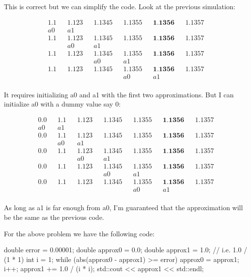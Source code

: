 This is correct but we can simplify the code. Look at the previous
simulation:

\begin{align*}
1.1         &&1.123       &&1.1345      &&1.1355      &&\textbf{1.1356} &&1.1357 \\
a0         &&a1 \\
1.1         &&1.123       &&1.1345      &&1.1355      &&\textbf{1.1356} &&1.1357 \\
&&a0        &&a1 \\
1.1         &&1.123       &&1.1345      &&1.1355      &&\textbf{1.1356} &&1.1357 \\
&&&&a0       &&a1 \\
1.1         &&1.123       &&1.1345      &&1.1355      &&\textbf{1.1356} &&1.1357 \\
&&&&&&a0      &&a1 \\
\end{align*}

It requires initializing a0 and a1 with the first two approximations.
But I can initialize a0 with a dummy value say 0:

\begin{align*}
0.0         &&1.1       &&1.123      &&1.1345      &&1.1355     &&\textbf{1.1356} &&1.1357 \\
a0         &&a1 \\
0.0         &&1.1       &&1.123      &&1.1345      &&1.1355     &&\textbf{1.1356} &&1.1357 \\
&&a0        &&a1 \\
0.0         &&1.1       &&1.123      &&1.1345      &&1.1355     &&\textbf{1.1356} &&1.1357 \\
&&&&a0       &&a1 \\
0.0         &&1.1       &&1.123      &&1.1345      &&1.1355     &&\textbf{1.1356} &&1.1357 \\
&&&&&&a0      &&a1 \\
0.0         &&1.1       &&1.123      &&1.1345      &&1.1355     &&\textbf{1.1356} &&1.1357 \\
&&&&&&&&a0      &&a1 \\
\end{align*}


As long as a1 is far enough from a0, I'm guaranteed that
the approximation will be the same as the previous code.

For the above problem we have the following code:
\begin{console}
double error = 0.00001;
double approx0 = 0.0;
double approx1 = 1.0; // i.e. 1.0 / (1 * 1)
int i = 1;
while (abs(approx0 - approx1) >= error)
{     
      approx0 = approx1;
      i++;
      approx1 += 1.0 / (i * i);
      std::cout << approx1 << std::endl;
}
\end{console}

